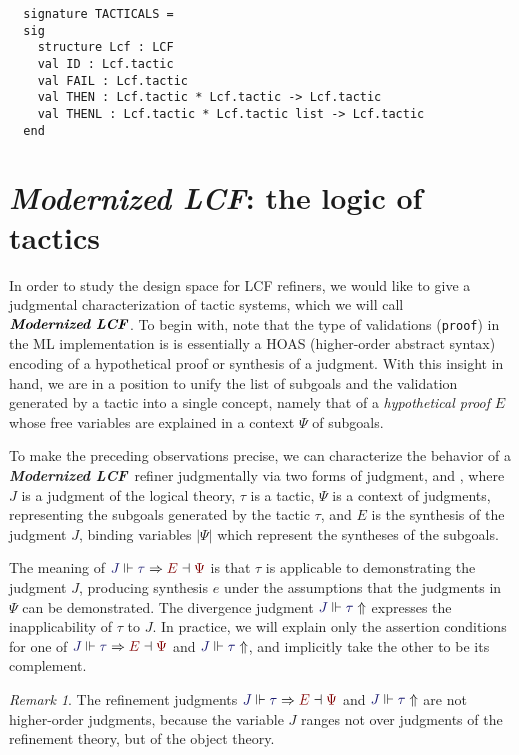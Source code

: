 \documentclass[11pt]{article}
\theoremstyle{definition}
\theoremstyle{remark}
\newtheorem{remark}[thm]{Remark}
\numberwithin{equation}{section}
\def\InputModeColorName{MidnightBlue}
\def\OutputModeColorName{Maroon}
\newcommand\InputMode[1]{{\color{\InputModeColorName}{#1}}}
\newcommand\OutputMode[1]{{\color{\OutputModeColorName}{#1}}}
\newcommand\JJ{J}
\newcommand\Refine[4]{\InputMode{#1}\Vdash\InputMode{#2}\Rightarrow\OutputMode{#4}\dashv\OutputMode{#3}}
\newcommand\NoRefine[2]{\InputMode{#1}\Vdash\InputMode{#2}\Uparrow}
\newcommand\Dom[1]{\left\vert#1\right\vert}
\newcommand\ModLCF{\textbf{\emph{Modernized LCF}}}
\begin{document}
\begin{lstlisting}
  signature TACTICALS =
  sig
    structure Lcf : LCF
    val ID : Lcf.tactic
    val FAIL : Lcf.tactic
    val THEN : Lcf.tactic * Lcf.tactic -> Lcf.tactic
    val THENL : Lcf.tactic * Lcf.tactic list -> Lcf.tactic
  end
\end{lstlisting}

\section{\ModLCF: the logic of tactics}

In order to study the design space for LCF refiners, we would like to give a
judgmental characterization of tactic systems, which we will call $\ModLCF$.
To begin with, note that the type of validations (\verb!proof!) in the ML
implementation is is essentially a HOAS (higher-order abstract syntax) encoding
of a hypothetical proof or synthesis of a judgment.  With this insight in hand,
we are in a position to unify the list of subgoals and the validation generated
by a tactic into a single concept, namely that of a \emph{hypothetical proof}
$E$ whose free variables are explained in a context $\Psi$ of subgoals.

To make the preceding observations precise, we can characterize the behavior of
a \ModLCF\ refiner judgmentally via two forms of judgment,
\framebox{$\Refine{\JJ}{\tau}{\Psi}{E}$} and \framebox{$\NoRefine{\JJ}{\tau}$}, where $\JJ$ is a judgment of the
logical theory, $\tau$ is a tactic, $\Psi$ is a context of judgments,
representing the subgoals generated by the tactic $\tau$, and $E$ is the
synthesis of the judgment $\JJ$, binding variables $\Dom{\Psi}$ which represent
the syntheses of the subgoals.

The meaning of $\Refine{\JJ}{\tau}{\Psi}{E}$ is that $\tau$ is applicable to
demonstrating the judgment $\JJ$, producing synthesis $e$ under the assumptions
that the judgments in $\Psi$ can be demonstrated. The divergence judgment
$\NoRefine{\JJ}{\tau}$ expresses the inapplicability of $\tau$ to $\JJ$.  In
practice, we will explain only the assertion conditions for one of
$\Refine{\JJ}{\tau}{\Psi}{E}$ and $\NoRefine{\JJ}{\tau}$, and implicitly take
the other to be its complement.

\begin{remark}
  The refinement judgments $\Refine{\JJ}{\tau}{\Psi}{E}$ and
  $\NoRefine{\JJ}{\tau}$ are not higher-order judgments, because the variable
  $\JJ$ ranges not over judgments of the refinement theory, but of the
  object theory.
\end{remark}
\end{document}
